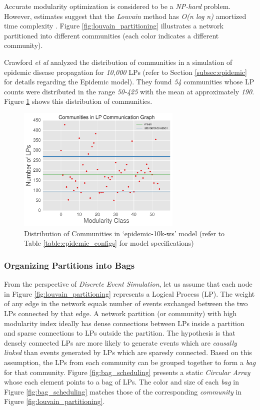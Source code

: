 \documentclass[11pt]{book}
\begin{document}
Accurate modularity optimization is considered to be a \emph{NP-hard} problem.  However, estimates suggest
that the \emph{Louvain} method has \emph{O(n log n)} amortized time complexity \cite{blondel-08}.  Figure
\ref{fig:louvain_partitioning} illustrates a network partitioned into different communities (each color
indicates a different community).

Crawford \emph{et al} \cite{crawford-17} analyzed the distribution of communities in a simulation of epidemic
disease propagation for \emph{10,000} LPs (refer to Section \ref{subsec:epidemic} for details regarding the
Epidemic model).  They found \emph{54} communities whose LP counts were distributed in the range \emph{50-425}
with the mean at approximately \emph{190}.  Figure \ref{fig:communities} shows this distribution of
communities.

\begin{figure}
    \centering
    \includegraphics[width=0.7\textwidth]{figures/communities.pdf}
    \caption{Distribution of Communities in `epidemic-10k-ws' model (refer to Table
        \ref{table:epidemic_configs} for model specifications)}
    \label{fig:communities}
\end{figure}

\subsubsection{Organizing Partitions into Bags}\label{subsubsec:bag_organization}

From the perspective of \emph{Discrete Event Simulation}, let us assume that each node in Figure
\ref{fig:louvain_partitioning} represents a Logical Process (LP).  The weight of any edge in the network
equals number of events exchanged between the two LPs connected by that edge.  A network partition (or
community) with high modularity index ideally has dense connections between LPs inside a partition and sparse
connections to LPs outside the partition.  The hypothesis is that densely connected LPs are more likely to
generate events which are \emph{causally linked} than events generated by LPs which are sparesly connected.
Based on this assumption, the LPs from each community can be grouped together to form a \emph{bag} for that
community.  Figure \ref{fig:bag_scheduling} presents a static \emph{Circular Array} whose each element points
to a bag of LPs.  The color and size of each \emph{bag} in Figure \ref{fig:bag_scheduling} matches those of
the corresponding \emph{community} in Figure \ref{fig:louvain_partitioning}.
\end{document}
